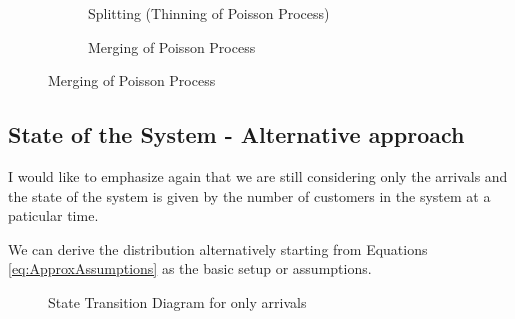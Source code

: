 \documentclass[11pt, a4paper]{report}
\begin{document}
\begin{figure}
    \begin{subfigure}[b]{0.45\textwidth}
        \centering
        
        \caption{Splitting (Thinning of Poisson Process)}
        \label{fig:split}
    \end{subfigure}
    \hfill
    \begin{subfigure}[b]{0.45\textwidth}
        \centering
        
        \caption{Merging of Poisson Process}
        \label{fig:merging}
    \end{subfigure}
    \label{fig:splitMerge}
\end{figure}


\subsection{State of the System - Alternative approach}
I would like to emphasize again that we are still considering only the arrivals and the state of the system is given by the number of customers in the system at a paticular time.

We can derive the distribution alternatively starting from Equations \ref{eq:ApproxAssumptions} as the basic setup or assumptions. 

\begin{figure}
    \centering
    
    \caption{State Transition Diagram for only arrivals}
    \label{fig:arrSTD}
\end{figure}
\end{document}
